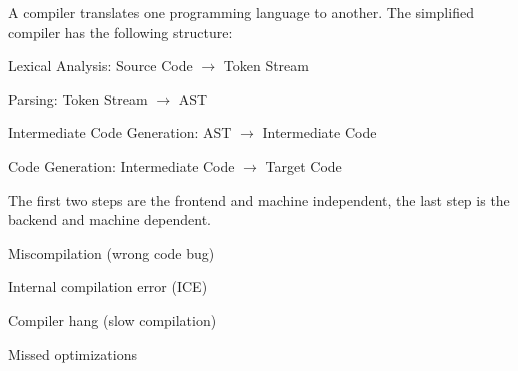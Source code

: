 A compiler translates one programming language to another. The simplified compiler has the following structure:
\begin{compactitem}[$\quad\bullet$]
	\item Lexical Analysis: Source Code $\to$ Token Stream
	\item Parsing: Token Stream $\to$ AST
	\item Intermediate Code Generation: AST $\to$ Intermediate Code
	\item Code Generation: Intermediate Code $\to$ Target Code
\end{compactitem}

The first two steps are the frontend and machine independent, the last step is the backend and machine dependent.

\begin{definition}
  \begin{itemize*}
      \item Miscompilation (wrong code bug)
      \item Internal compilation error (ICE)
      \item Compiler hang (slow compilation)
      \item Missed optimizations
  \end{itemize*}
\end{definition}